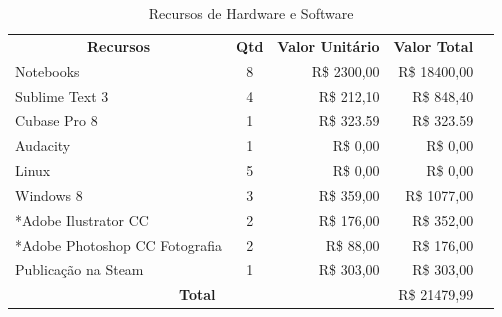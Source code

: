 \documentclass[11pt]{article} %
\begin{document}
\begin{table}[h]
\centering
\begin{tabular}{|l|l|l|l|l}
\cline{1-4}
\multicolumn{1}{|c|}{\textbf{Recursos}} & \multicolumn{1}{c|}{\textbf{Qtd}} & \multicolumn{1}{c|}{\textbf{Valor Unitário}} & \multicolumn{1}{c|}{\textbf{Valor Total}} &  \\ \cline{1-4}
Notebooks                               & \multicolumn{1}{c|}{8}            & \multicolumn{1}{r|}{R\$ 2300,00}             & \multicolumn{1}{r|}{R\$ 18400,00}         &  \\ \cline{1-4}
Sublime Text 3                          & \multicolumn{1}{c|}{4}            & \multicolumn{1}{r|}{R\$ 212,10}              & \multicolumn{1}{r|}{R\$ 848,40}           &  \\ \cline{1-4}
Cubase Pro 8                            & \multicolumn{1}{c|}{1}            & \multicolumn{1}{r|}{R\$ 323.59}              & \multicolumn{1}{r|}{R\$ 323.59}           &  \\ \cline{1-4}
Audacity                                & \multicolumn{1}{c|}{1}            & \multicolumn{1}{r|}{R\$ 0,00}                & \multicolumn{1}{r|}{R\$ 0,00}             &  \\ \cline{1-4}
Linux                                   & \multicolumn{1}{c|}{5}            & \multicolumn{1}{r|}{R\$ 0,00}                & \multicolumn{1}{r|}{R\$ 0,00}             &  \\ \cline{1-4}
Windows 8                               & \multicolumn{1}{c|}{3}            & \multicolumn{1}{r|}{R\$ 359,00}              & \multicolumn{1}{r|}{R\$ 1077,00}          &  \\ \cline{1-4}
*Adobe Ilustrator CC                    & \multicolumn{1}{c|}{2}            & \multicolumn{1}{r|}{R\$ 176,00}              & \multicolumn{1}{r|}{R\$ 352,00}           &  \\ \cline{1-4}
*Adobe Photoshop CC Fotografia          & \multicolumn{1}{c|}{2}            & \multicolumn{1}{r|}{R\$ 88,00}               & \multicolumn{1}{r|}{R\$ 176,00}           &  \\ \cline{1-4}
Publicação na Steam                     & \multicolumn{1}{c|}{1}            & \multicolumn{1}{r|}{R\$ 303,00}              & \multicolumn{1}{r|}{R\$ 303,00}           &  \\ \cline{1-4}
\multicolumn{3}{|c|}{\textbf{Total}}                                                                                       & \multicolumn{1}{r|}{R\$ 21479,99}         &  \\ \cline{1-4}
\end{tabular}
\caption {Recursos de Hardware e Software}
\end{table}
\end{document}

